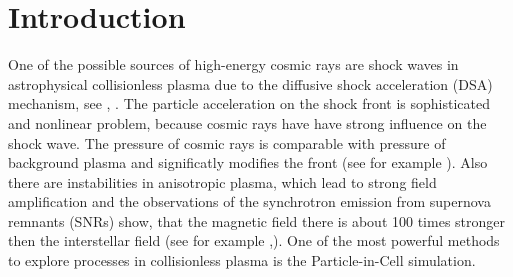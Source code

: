 \section{Introduction}
One of the possible sources of high-energy cosmic rays are shock waves in astrophysical collisionless plasma due to the diffusive shock acceleration (DSA) mechanism, see \cite{Bell1978}, \cite{Blandford1978}. The particle acceleration on the shock front is sophisticated and nonlinear problem, because cosmic rays have have strong influence on the shock wave. The pressure of cosmic rays is comparable with pressure of background plasma and significatly modifies the front (see for example \cite{Bykov2014}). Also there are instabilities in anisotropic plasma, which lead to strong field amplification and the observations of the synchrotron emission from supernova remnants (SNRs) show, that the magnetic field there is about 100 times stronger then the interstellar field (see for example \cite{Berezhko2003},\cite{Uchiyama2007}). One of the most powerful methods to explore processes in collisionless plasma is the Particle-in-Cell simulation. 
